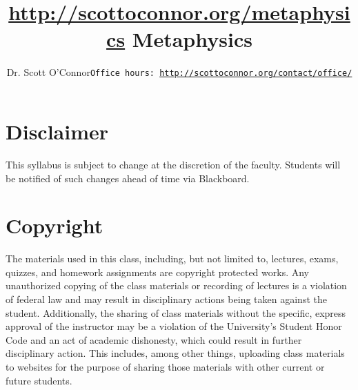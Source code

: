 \documentclass[article,oneside]{memoir}
\def\myauthor{Author}
\def\mytitle{Title}
\def\mycopyright{\myauthor}
\def\myweb{\href{http://scottoconnor.org/metaphysics}{http://scottoconnor.org/metaphysics}}
\def\myauthor{Dr. Scott O'Connor}
\def\mytitle{{\normalsize \myweb \newline} \HUGE Metaphysics}
\begin{document}
\setsansfont[Mapping=tex-text]{Myriad Pro} 
\setmonofont[Mapping=tex-text,Scale=0.8]{Georgia} 

\def\ind{\hangindent=1 true cm\hangafter=1 \noindent}
\def\labelitemi{$\cdot$}


\title{\LARGE \mytitle}     
\author{\Large\myauthor \newline \footnotesize\texttt{\noindent Office hours: \href{http://scottoconnor.org/contact/office/}{http://scottoconnor.org/contact/office/}}}


\maketitle




%
%

\section{Disclaimer}
 This syllabus is subject to change at the discretion of the faculty. Students will be notified of such changes ahead of time via Blackboard. 

\section{Copyright}
The materials used in this class, including, but not limited to, lectures, exams, quizzes, and homework assignments are copyright protected works.  Any unauthorized copying of the class materials or recording of lectures is a violation of federal law and may result in disciplinary actions being taken against the student.  Additionally, the sharing of class materials without the specific, express approval of the instructor may be a violation of the University's Student Honor Code and an act of academic dishonesty, which could result in further disciplinary action.  This includes, among other things, uploading class materials to websites for the purpose of sharing those materials with other current or future students. 
\end{document}
